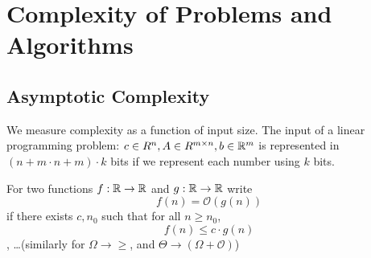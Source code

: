 \chapter{Complexity of Problems and Algorithms}
\label{cha:comp-probl-algor}

\section{Asymptotic Complexity}
\label{sec:asympt-compl}

We measure complexity as a function of input size.  The input of a
linear programming problem: $c \in R^{n}, A \in R^{m \times n}, b \in
\mathbb{R}^{m}$ is represented in $(n + m \cdot n + m) \cdot k$ bits if we
represent each number using $k$ bits.

For two functions $f: \mathbb{R} \rightarrow \mathbb{R}$ and $g: \mathbb{R} \rightarrow \mathbb{R}$
write
\begin{equation}
  \label{eq:27}
  f(n) = \mathcal{O}(g(n))
\end{equation}
if there exists $c, n_{0}$ such that for all $n \geq n_{0}$,
\begin{equation}
  \label{eq:27}
  f(n) \leq c \cdot g(n)
\end{equation}, \dots (similarly for $\Omega \rightarrow \geq$, and
$\Theta \rightarrow (\Omega + \mathcal{O})$)

